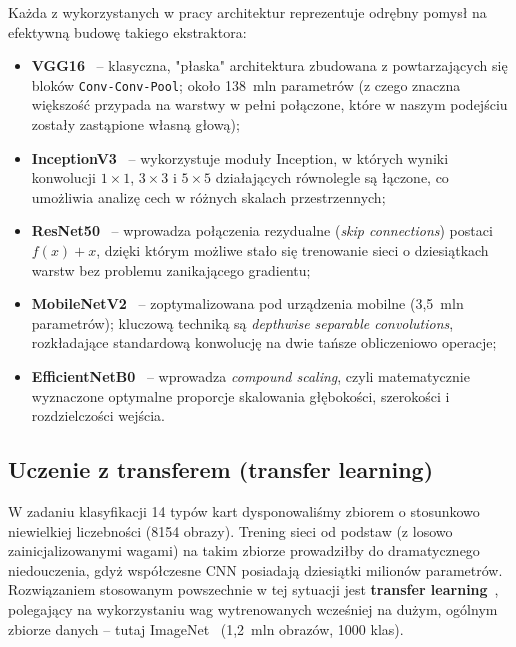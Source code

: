 \documentclass[12pt]{article}
\begin{document}
Każda z wykorzystanych w pracy architektur reprezentuje odrębny pomysł na efektywną budowę takiego ekstraktora:

\begin{itemize}
  \item {\bf VGG16}~\cite{vgg} -- klasyczna, "płaska" architektura zbudowana z powtarzających się bloków \texttt{Conv-Conv-Pool}; około 138~mln parametrów (z czego znaczna większość przypada na warstwy w pełni połączone, które w naszym podejściu zostały zastąpione własną głową);
  \item {\bf InceptionV3}~\cite{inceptionv3} -- wykorzystuje moduły Inception, w których wyniki konwolucji $1 \times 1$, $3 \times 3$ i $5 \times 5$ działających równolegle są łączone, co umożliwia analizę cech w różnych skalach przestrzennych;
  \item {\bf ResNet50}~\cite{resnet} -- wprowadza połączenia rezydualne (\textit{skip connections}) postaci $f(x) + x$, dzięki którym możliwe stało się trenowanie sieci o dziesiątkach warstw bez problemu zanikającego gradientu;
  \item {\bf MobileNetV2}~\cite{mobilenetv2} -- zoptymalizowana pod urządzenia mobilne (3{,}5~mln parametrów); kluczową techniką są \textit{depthwise separable convolutions}, rozkładające standardową konwolucję na dwie tańsze obliczeniowo operacje;
  \item {\bf EfficientNetB0}~\cite{efficientnet} -- wprowadza \textit{compound scaling}, czyli matematycznie wyznaczone optymalne proporcje skalowania głębokości, szerokości i rozdzielczości wejścia.
\end{itemize}

\subsection{Uczenie z transferem (transfer learning)}

W zadaniu klasyfikacji 14 typów kart dysponowaliśmy zbiorem o stosunkowo niewielkiej liczebności (8154 obrazy). Trening sieci od podstaw (z losowo zainicjalizowanymi wagami) na takim zbiorze prowadziłby do dramatycznego niedouczenia, gdyż współczesne CNN posiadają dziesiątki milionów parametrów. Rozwiązaniem stosowanym powszechnie w tej sytuacji jest {\bf transfer learning}~\cite{transfer_yosinski}, polegający na wykorzystaniu wag wytrenowanych wcześniej na dużym, ogólnym zbiorze danych -- tutaj ImageNet~\cite{imagenet} (1{,}2~mln obrazów, 1000 klas).
\end{document}

